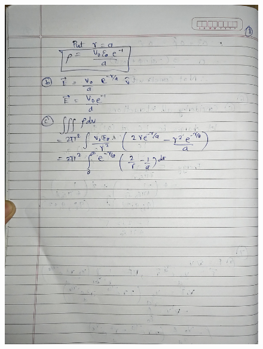 \documentclass{article}
\begin{document}
\begin{figure}[H]
    \centering
    \includegraphics[width=\textwidth]{figs/written/8.jpg}
\end{figure}
\end{document}
